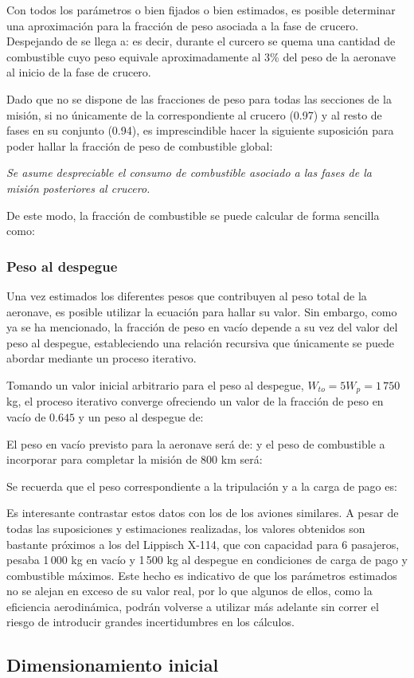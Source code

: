 Con todos los parámetros o bien fijados o bien estimados, es posible determinar una aproximación para la fracción de peso asociada a la fase de crucero. Despejando de  se llega a:
es decir, durante el curcero se quema una cantidad de combustible cuyo peso equivale aproximadamente al 3\% del peso de la aeronave al inicio de la fase de crucero.

Dado que no se dispone de las fracciones de peso para todas las secciones de la misión, si no únicamente de la correspondiente al crucero (0.97) y al resto de fases en su conjunto (0.94), es imprescindible hacer la siguiente suposición para poder hallar la fracción de peso de combustible global:

\emph{Se asume despreciable el consumo de combustible asociado a las fases de la misión posteriores al crucero.}

De este modo, la fracción de combustible se puede calcular de forma sencilla como:


\subsubsection{Peso al despegue}
\label{sec:design:weights:to}

Una vez estimados los diferentes pesos que contribuyen al peso total de la aeronave, es posible utilizar la ecuación  para hallar su valor. Sin embargo, como ya se ha mencionado, la fracción de peso en vacío depende a su vez del valor del peso al despegue, estableciendo una relación recursiva que únicamente se puede abordar mediante un proceso iterativo.

Tomando un valor inicial arbitrario para el peso al despegue, $W_{to} = 5W_p = 1\,750$ kg, el proceso iterativo converge ofreciendo un valor de la fracción de peso en vacío de $0.645$ y un peso al despegue de:

El peso en vacío previsto para la aeronave será de:
y el peso de combustible a incorporar para completar la misión de 800 km será:

Se recuerda que el peso correspondiente a la tripulación y a la carga de pago es:

Es interesante contrastar estos datos con los de los aviones similares. A pesar de todas las suposiciones y estimaciones realizadas, los valores obtenidos son bastante próximos a los del Lippisch X-114, que con capacidad para 6 pasajeros, pesaba 1\,000 kg en vacío y 1\,500 kg al despegue en condiciones de carga de pago y combustible máximos. Este hecho es indicativo de que los parámetros estimados no se alejan en exceso de su valor real, por lo que algunos de ellos, como la eficiencia aerodinámica, podrán volverse a utilizar más adelante sin correr el riesgo de introducir grandes incertidumbres en los cálculos.


\subsection{Dimensionamiento inicial}
\label{sec:design:sizing}



